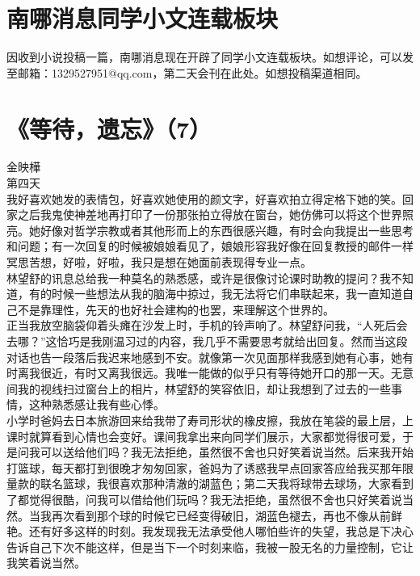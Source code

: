 \documentclass[letterpaper, 12pt]{article}
\begin{document}
\begin{multicols}{2}
\section{南哪消息同学小文连载板块}
因收到小说投稿一篇，南哪消息现在开辟了同学小文连载板块。如想评论，可以发至邮箱：1329527951@qq.com，第二天会刊在此处。如想投稿渠道相同。
\section{《等待，遗忘》（7）}
金映樺\\
\newCJKfontfamily{}\fan
第四天\\

我好喜欢她发的表情包，好喜欢她使用的颜文字，好喜欢拍立得定格下她的笑。回家之后我鬼使神差地再打印了一份那张拍立得放在窗台，她仿佛可以将这个世界照亮。她好像对哲学宗教或者其他形而上的东西很感兴趣，有时会向我提出一些思考和问题；有一次回复的时候被娘娘看见了，娘娘形容我好像在回复教授的邮件一样冥思苦想，好啦，好啦，我只是想在她面前表现得专业一点。\\

林望舒的讯息总给我一种莫名的熟悉感，或许是很像讨论课时助教的提问？我不知道，有的时候一些想法从我的脑海中掠过，我无法将它们串联起来，我一直知道自己不是靠理性，先天的也好社会建构的也罢，来理解这个世界的。\\

正当我放空脑袋仰着头瘫在沙发上时，手机的铃声响了。林望舒问我，“人死后会去哪？”这恰巧是我刚温习过的内容，我几乎不需要思考就给出回复。然而当这段对话也告一段落后我迟来地感到不安。就像第一次见面那样我感到她有心事，她有时离我很近，有时又离我很远。我唯一能做的似乎只有等待她开口的那一天。无意间我的视线扫过窗台上的相片，林望舒的笑容依旧，却让我想到了过去的一些事情，这种熟悉感让我有些心悸。\\

小学时爸妈去日本旅游回来给我带了寿司形状的橡皮擦，我放在笔袋的最上层，上课时就算看到心情也会变好。课间我拿出来向同学们展示，大家都觉得很可爱，于是问我可以送给他们吗？我无法拒绝，虽然很不舍也只好笑着说当然。后来我开始打篮球，每天都打到很晚才匆匆回家，爸妈为了诱惑我早点回家答应给我买那年限量款的联名篮球，我很喜欢那种清澈的湖蓝色；第二天我将球带去球场，大家看到了都觉得很酷，问我可以借给他们玩吗？我无法拒绝，虽然很不舍也只好笑着说当然。当我再次看到那个球的时候它已经变得破旧，湖蓝色褪去，再也不像从前鲜艳。还有好多这样的时刻。我发现我无法承受他人哪怕些许的失望，我总是下决心告诉自己下次不能这样，但是当下一个时刻来临，我被一股无名的力量控制，它让我笑着说当然。\\


\end{multicols}
\end{document}
